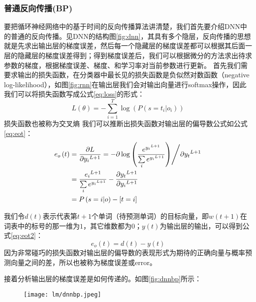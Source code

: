 \subsubsection{普通反向传播(BP)}
要把循环神经网络中的基于时间的反向传播算法讲清楚，我们首先要介绍DNN中的普通的反向传播。见DNN的结构图\ref{fig:dnn}，其具有多个隐层，反向传播的思想就是先求出输出层的梯度误差，然后每一个隐藏层的梯度误差都可以根据其后面一层的隐藏层的梯度误差得到；得到梯度误差后，我们可以根据微分的方法求出待求参数的梯度，根据梯度误差、梯度、和学习率对当前参数进行更新。
首先我们需要求输出的损失函数，在分类器中最长见的损失函数是负似然对数函数（negative log-likelihood），如图\ref{fig:rnn}在输出层我们会对输出向量进行softmax操作，因此我们可以将损失函数写成公式\ref{eq:loss}的形式：
\begin{equation}
	\label{eq:loss}
   	L\left( \theta  \right) =  - \sum\limits_{i = 1}^T {\log \left( {P\left( {s = {t_i}|{o_i}} \right)} \right)} 
\end{equation}
损失函数也被称为交叉熵
我们可以推断出损失函数对输出层的偏导数公式如公式\ref{eq:eot}：
\begin{equation}
\begin{split}
\label{eq:eot} 	
	{e_o}\left( t \right) &= \frac{{\partial L}}{{\partial {y_i}^{L + 1}}}{\rm{ }} = {\rm{ }}{{ - \partial \log \left( {\frac{{{e^{{y_t}^{L + 1}}}}}{{\sum\limits_i {{e^{{y_i}^{L + 1}}}} }}} \right)} \mathord{\left/
	 {\vphantom {{ - \partial \log \left( {\frac{{{e^{{y_t}^{L + 1}}}}}{{\sum\limits_i {{e^{{y_i}^{L + 1}}}} }}} \right)} {\partial {y_t}^{L + 1}}}} \right.
 \kern-\nulldelimiterspace} {\partial {y_t}^{L + 1}}}\\
	&=  \frac{{{e_i}^{L + 1}}}{{\sum\limits_i {{e^{{y_i}^{L + 1}}}} }} - \frac{{\partial {y_t}^{L + 1}}}{{\partial {y_i}^{L + 1}}}\\
	&=  P\left( {s = i|o} \right) - [t = i]
\end{split}
\end{equation}

	我们令$d(t)$表示代表第$t+1$个单词（待预测单词）的目标向量，即$w(t+1)$在词表中的标号的那一维为$1$，其它维数都为$0$；$y(t)$为输出层的输出，可以得到公式\ref{eq:eot2}：
\begin{equation}
	\label{eq:eot2}
   	{e_o}\left( t \right) = d\left( t \right) - y\left( t \right)
\end{equation}
因为非常碰巧的损失函数对输出层的偏导数的表现形式为期待的正确向量与概率预测向量之间的差，所以也被称为梯度误差或error。


接着分析输出层的梯度误差是如何传递的。如图\ref{fig:dnnbp}所示：
\begin{figure}[!htbp]
  \centering
  \begin{minipage}[b]{0.6\textwidth}
    \captionstyle{\centering}
    \centering
    \texttt{[image: lm/dnnbp.jpeg]}
  \end{minipage}     
\end{figure}

